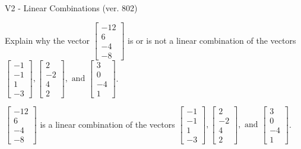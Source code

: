 \begin{exercise}
  \begin{exerciseTitle}V2 - Linear Combinations (ver. 802)\end{exerciseTitle}
  \begin{exerciseStatement}
    Explain why the vector \(\left[\begin{array}{c}
-12 \\
6 \\
-4 \\
-8
\end{array}\right]\)  is or is not a linear 
	combination of the vectors \(\left[\begin{array}{c}
-1 \\
-1 \\
1 \\
-3
\end{array}\right] , \left[\begin{array}{c}
2 \\
-2 \\
4 \\
2
\end{array}\right] , \text{ and } \left[\begin{array}{c}
3 \\
0 \\
-4 \\
1
\end{array}\right]\).
	


  \end{exerciseStatement}
  \begin{exerciseAnswer}
   \(\left[\begin{array}{c}
-12 \\
6 \\
-4 \\
-8
\end{array}\right]\) 
  	 is  
	a linear combination of the vectors \(\left[\begin{array}{c}
-1 \\
-1 \\
1 \\
-3
\end{array}\right] , \left[\begin{array}{c}
2 \\
-2 \\
4 \\
2
\end{array}\right] , \text{ and } \left[\begin{array}{c}
3 \\
0 \\
-4 \\
1
\end{array}\right]\).

	
  


  \end{exerciseAnswer}
\end{exercise}